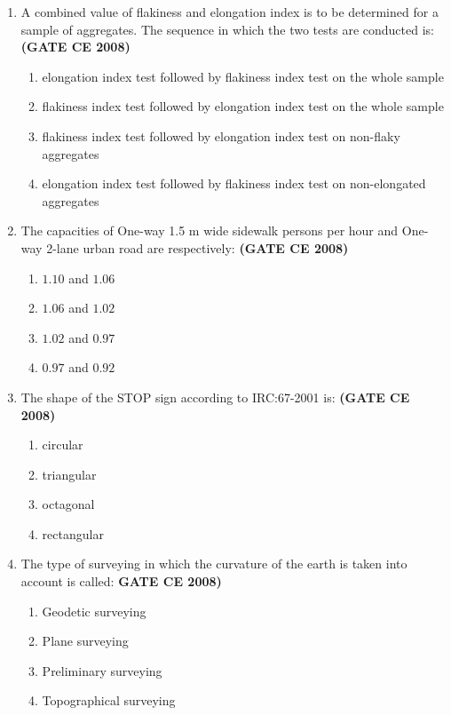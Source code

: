 \documentclass[journal]{IEEEtran}
\begin{document}
\begin{enumerate}
\item A combined value of flakiness and elongation index is to be determined for a sample of aggregates. The sequence in which the two tests are conducted is: \textbf{(GATE CE 2008)}

\begin{enumerate}
\item elongation index test followed by flakiness index test on the whole sample
\item flakiness index test followed by elongation index test on the whole sample
\item flakiness index test followed by elongation index test on non-flaky aggregates
\item elongation index test followed by flakiness index test on non-elongated aggregates
\end{enumerate}

\item The capacities of One-way 1.5 m wide sidewalk persons per hour and One-way 2-lane urban road  are respectively: \textbf{(GATE CE 2008)}
\begin{multicols}{2}
\begin{enumerate}
\item $1.10$ and $1.06$  
\item $1.06$ and $1.02$  
\item $1.02$ and $0.97$  
\item $0.97$ and $0.92$
\end{enumerate}
\end{multicols}

\item The shape of the STOP sign according to IRC:67-2001 is: \textbf{(GATE CE 2008)}
\begin{multicols}{2}
\begin{enumerate}
\item circular \hspace{1.2cm}
\item triangular
\item octagonal \hspace{1cm}
\item rectangular
\end{enumerate}
\end{multicols}

\item The type of surveying in which the curvature of the earth is taken into account is called: \textbf{GATE CE 2008)}
\begin{multicols}{2}
\begin{enumerate}
\item Geodetic surveying \hspace{1.4cm}
\item Plane surveying
\item Preliminary surveying \hspace{1cm}
\item Topographical surveying
\end{enumerate}
\end{multicols}


\end{enumerate}
\end{document}
